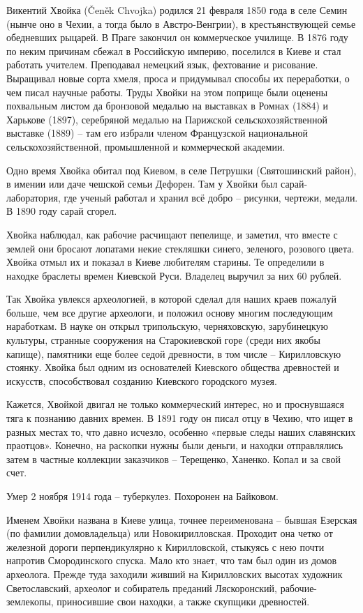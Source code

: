 Викентий Хвойка (Čeněk Chvojka) родился 21 февраля 1850 года в селе Семин (нынче оно в Чехии, а тогда было в Австро-Венгрии), в крестьянствующей семье обедневших рыцарей. В Праге закончил он коммерческое училище. В 1876 году по неким причинам сбежал в Российскую империю, поселился в Киеве и стал работать учителем. Преподавал немецкий язык, фехтование и рисование. Выращивал новые сорта хмеля, проса и придумывал способы их переработки, о чем писал научные работы. Труды Хвойки на этом поприще были оценены похвальным листом да бронзовой медалью на выставках в Ромнах (1884) и Харькове (1897), серебряной медалью на Парижской сельскохозяйственной выставке (1889) – там его избрали членом Французской национальной сельскохозяйственной, промышленной и коммерческой академии.

Одно время Хвойка обитал под Киевом, в селе Петрушки (Святошинский район), в имении или даче чешской семьи Дефорен. Там у Хвойки был сарай-лаборатория, где ученый работал и хранил всё добро – рисунки, чертежи, медали. В 1890 году сарай сгорел. 

Хвойка наблюдал, как рабочие расчищают пепелище, и заметил, что вместе с землей они бросают лопатами некие стекляшки синего, зеленого, розового цвета. Хвойка отмыл их и показал в Киеве любителям старины. Те определили в находке браслеты времен Киевской Руси. Владелец выручил за них 60 рублей.

Так Хвойка увлекся археологией, в которой сделал для наших краев пожалуй больше, чем все другие археологи, и положил основу многим последующим наработкам. В науке он открыл трипольскую, черняховскую, зарубинецкую культуры, странные сооружения на Старокиевской горе (среди них якобы капище), памятники еще более седой древности, в том числе – Кирилловскую стоянку. Хвойка был одним из основателей Киевского общества древностей и искусств, способствовал созданию Киевского городского музея.

Кажется, Хвойкой двигал не только коммерческий интерес, но и проснувшаяся тяга к познанию давних времен. В 1891 году он писал отцу в Чехию, что ищет в разных местах то, что давно исчезло, особенно «первые следы наших славянских праотцов». Конечно, на раскопки нужны были деньги, и находки отправлялись затем в частные коллекции заказчиков – Терещенко, Ханенко. Копал и за свой счет.

Умер 2 ноября 1914 года – туберкулез. Похоронен на Байковом.

Именем Хвойки названа в Киеве улица, точнее переименована – бывшая Езерская (по фамилии домовладельца) или Новокирилловская. Проходит она четко от железной дороги перпендикулярно к Кирилловской, стыкуясь с нею почти напротив Смородинского спуска. Мало кто знает, что там был один из домов археолога. Прежде туда заходили живший на Кирилловских высотах художник Светославский, археолог и собиратель преданий Ляскоронский, рабочие-землекопы, приносившие свои находки, а также скупщики древностей.


